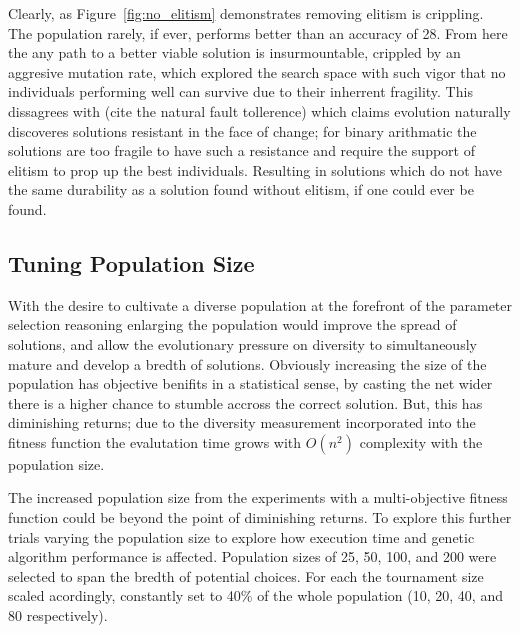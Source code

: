 Clearly, as Figure~\ref{fig:no_elitism} demonstrates removing elitism is crippling.
The population rarely, if ever, performs better than an accuracy of 28. From here
the any path to a better viable solution is insurmountable, crippled by an aggresive
mutation rate, which explored the search space with such vigor that no individuals
performing well can survive due to their inherrent fragility. This dissagrees with
(\todo cite the natural fault tollerence) which claims evolution naturally discoveres
solutions resistant in the face of change; for binary arithmatic the solutions are
too fragile to have such a resistance and require the support of elitism to prop
up the best individuals. Resulting in solutions which do not have the same durability
as a solution found without elitism, if one could ever be found.

\subsection{Tuning Population Size \label{ss:pop_size}}

With the desire to cultivate a diverse population at the forefront of the parameter
selection reasoning enlarging the population would improve the spread of solutions,
and allow the evolutionary pressure on diversity to simultaneously mature and
develop a bredth of solutions.
Obviously increasing the size of the population has objective benifits in a statistical
sense, by casting the net wider there is a higher chance to stumble
accross the correct solution.
But, this has diminishing returns; due to the diversity measurement incorporated into
the fitness function the evalutation time grows with $O(n^2)$ complexity with the
population size.

The increased population size from the experiments with a multi-objective
fitness function could be beyond the point of diminishing returns. To explore this
further trials varying the population size to explore how execution time and
genetic algorithm performance is affected. Population sizes of 25, 50, 100, and 200
were selected to span the bredth of potential choices. For each the tournament size
scaled acordingly, constantly set to 40\% of the whole population (10, 20, 40, and
80 respectively).

